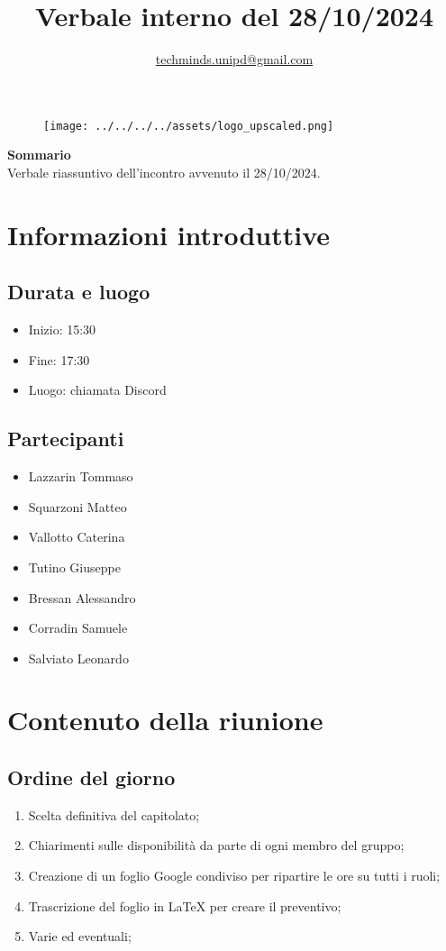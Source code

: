 \documentclass[10pt]{article}
\title{\textbf{Verbale interno del 28/10/2024}}
\author{\href{mailto:techminds.unipd@gmail.com}{techminds.unipd@gmail.com}}
\date{}
\begin{document}
\begin{figure}
    \centering
    \texttt{[image: ../../../../assets/logo\_upscaled.png]}
\end{figure}
\maketitle
\begin{center}

  \textbf{Sommario}\\
  \vspace{3mm}
  Verbale riassuntivo dell'incontro avvenuto il 28/10/2024.
\end{center}
\newpage
\tableofcontents{\newpage}

\section{Informazioni introduttive}
\subsection{Durata e luogo}
\begin{itemize}
  \item Inizio: 15:30
  \item Fine: 17:30
  \item Luogo: chiamata Discord
\end{itemize}
\subsection{Partecipanti}
\begin{itemize}
  \item Lazzarin Tommaso
  \item Squarzoni Matteo
  \item Vallotto Caterina
  \item Tutino Giuseppe
  \item Bressan Alessandro
  \item Corradin Samuele
  \item Salviato Leonardo
\end{itemize}

\section{Contenuto della riunione}
\subsection{Ordine del giorno}
\begin{enumerate}
  \item Scelta definitiva del capitolato;
  \item Chiarimenti sulle disponibilità da parte di ogni membro del gruppo;
  \item Creazione di un foglio Google condiviso per ripartire le ore su tutti i ruoli;
  \item Trascrizione del foglio in LaTeX per creare il preventivo;
  \item Varie ed eventuali;
\end{enumerate}
\end{document}
